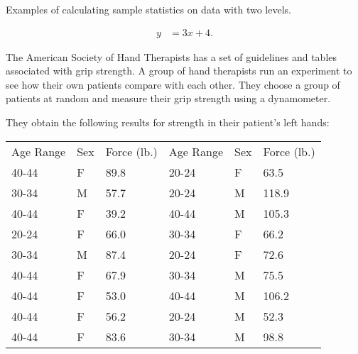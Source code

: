 


\begin{problem}
\item Examples of calculating sample statistics on data with two levels.

  \begin{subproblem}
  \item 
    \begin{eqnarray}
      y & = 3x + 4.
    \end{eqnarray}
    \vfill
  \end{subproblem}


\end{problem}




The American Society of Hand Therapists has a set of guidelines and
tables associated with grip strength. A group of hand therapists run
an experiment to see how their own patients compare with each
other. They choose a group of patients at random and measure their
grip strength using a dynamometer. 

They obtain the following results for strength in their patient's
left hands: \\
\begin{tabular}{lll@{\hspace{4em}}lll}
Age Range & Sex & Force (lb.) & Age Range & Sex & Force (lb.) \\
40-44 & F & 89.8 & 20-24 & F & 63.5 \\
30-34 & M & 57.7 & 20-24 & M & 118.9 \\
40-44 & F & 39.2 & 40-44 & M & 105.3 \\
20-24 & F & 66.0 & 30-34 & F & 66.2 \\
30-34 & M & 87.4 & 20-24 & F & 72.6 \\
40-44 & F & 67.9 & 30-34 & M & 75.5 \\
40-44 & F & 53.0 & 40-44 & M & 106.2 \\
40-44 & F & 56.2 & 20-24 & M & 52.3 \\
40-44 & F & 83.6 & 30-34 & M & 98.8
\end{tabular}

